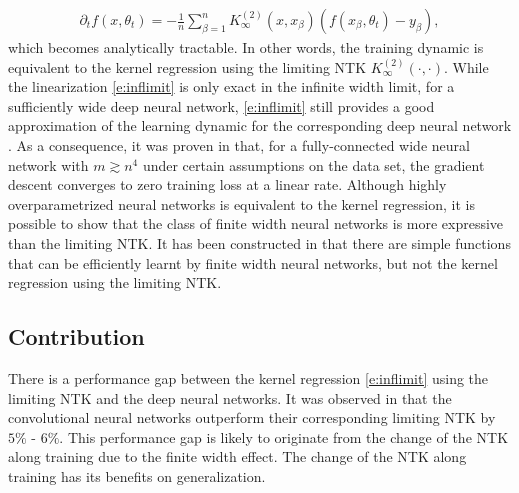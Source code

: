 \documentclass{article}
\numberwithin{equation}{section}
\newcommand{\del}{\partial}
\newcommand{\1}{\mathds{1}}
\theoremstyle{plain} %
\begin{document}
\begin{align}\label{e:inflimit}
\del_t f(x,\theta_t)
=-\frac{1}{n}\sum_{\beta=1}^n K^{(2)}_\infty(x,x_\beta) (f(x_\beta, \theta_t)-y_\beta),
\end{align}
which becomes analytically tractable. In other words, the training dynamic is equivalent to the kernel regression using the limiting NTK $K_\infty^{(2)}(\cdot, \cdot)$. 
While the linearization \eqref{e:inflimit} is only exact in the infinite width limit, for a sufficiently wide deep neural network, \eqref{e:inflimit} still provides a good approximation of the learning dynamic for the corresponding deep neural network \cite{du2018gradient1,du2018gradient2, lee2019wide}. As a consequence, it was proven in \cite{du2018gradient1,du2018gradient2} that,  for a fully-connected wide neural network with $m\gtrsim n^4$ under certain assumptions on the data set,  the gradient descent converges to zero training loss at a linear rate. Although highly overparametrized neural networks is equivalent to the kernel regression, it is possible to show that the class of finite width neural networks is more expressive than the limiting NTK. It has been constructed in \cite{ghorbani2019linearized,yehudai2019power,allen2019can} that there are simple functions that can be efficiently learnt by finite width neural networks, but not the kernel regression using the limiting NTK.





\subsection{Contribution}
There is a performance gap between the kernel regression \eqref{e:inflimit} using the limiting NTK and the deep neural networks. It was observed in \cite{arora2019exact} that  the convolutional neural networks outperform their corresponding limiting NTK by $5\%$ - $6\%$. This performance gap is likely to originate  from the change of the NTK along training due to the finite width effect. The change of the NTK along training has its benefits on generalization. 
\end{document}
